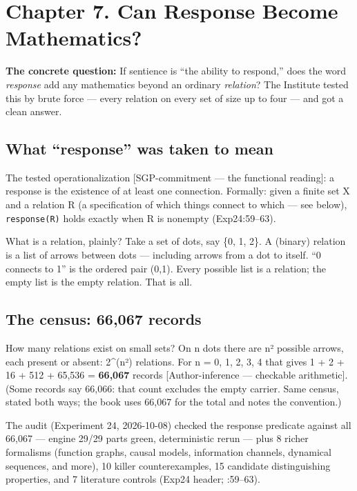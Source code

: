\documentclass[
  11pt,
]{book}
\begin{document}
\newpage

\chapter{Chapter 7. Can Response Become
Mathematics?}\label{chapter-7.-can-response-become-mathematics}

\textbf{The concrete question:} If sentience is ``the ability to
respond,'' does the word \emph{response} add any mathematics beyond an
ordinary \emph{relation}? The Institute tested this by brute force ---
every relation on every set of size up to four --- and got a clean
answer.

\section{What ``response'' was taken to
mean}\label{what-response-was-taken-to-mean}

The tested operationalization {[}SGP-commitment --- the functional
reading{]}: a response is the existence of at least one connection.
Formally: given a finite set X and a relation R (a specification of
which things connect to which --- see below), \texttt{response(R)} holds
exactly when R is nonempty (Exp24:59--63).

What is a relation, plainly? Take a set of dots, say \{0, 1, 2\}. A
(binary) relation is a list of arrows between dots --- including arrows
from a dot to itself. ``0 connects to 1'' is the ordered pair (0,1).
Every possible list is a relation; the empty list is the empty relation.
That is all.

\section{The census: 66,067 records}\label{the-census-66067-records}

How many relations exist on small sets? On n dots there are n² possible
arrows, each present or absent: 2\^{}(n²) relations. For n = 0, 1, 2, 3,
4 that gives 1 + 2 + 16 + 512 + 65,536 = \textbf{66,067} records
{[}Author-inference --- checkable arithmetic{]}. (Some records say
66,066: that count excludes the empty carrier. Same census, stated both
ways; the book uses 66,067 for the total and notes the convention.)

The audit (Experiment 24, 2026-10-08) checked the response predicate
against all 66,067 --- engine 29/29 parts green, deterministic rerun ---
plus 8 richer formalisms (function graphs, causal models, information
channels, dynamical sequences, and more), 10 killer counterexamples, 15
candidate distinguishing properties, and 7 literature controls (Exp24
header; :59--63).
\end{document}
